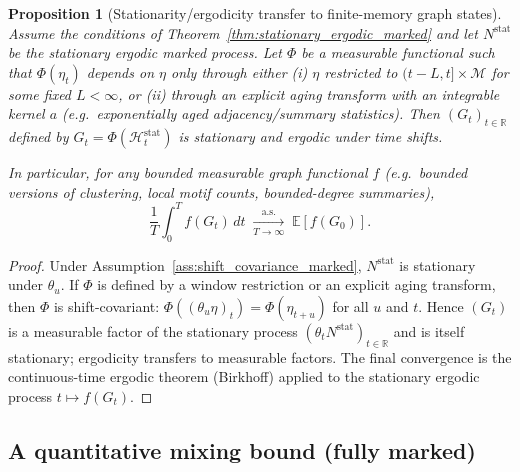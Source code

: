 \documentclass[12pt]{article}
\newtheorem{proposition}[theorem]{Proposition}
\begin{document}
\begin{proposition}[Stationarity/ergodicity transfer to finite-memory graph states]
\label{prop:graph_state_ergodic}
Assume the conditions of Theorem~\ref{thm:stationary_ergodic_marked} and let $N^{\mathrm{stat}}$ be the stationary ergodic marked process.
Let $\Phi$ be a measurable functional such that $\Phi(\eta_t)$ depends on $\eta$ only through either (i) $\eta$ restricted to $(t-L,t]\times\mathcal M$ for some fixed $L<\infty$,
or (ii) through an explicit aging transform with an integrable kernel $a$ (e.g.\ exponentially aged adjacency/summary statistics).
Then $(G_t)_{t\in\mathbb R}$ defined by $G_t=\Phi(\mathcal H_t^{\mathrm{stat}})$ is stationary and ergodic under time shifts.

In particular, for any bounded measurable graph functional $f$ (e.g.\ bounded versions of clustering, local motif counts, bounded-degree summaries),
\[
\frac{1}{T}\int_0^T f(G_t)\,dt \;\xrightarrow[T\to\infty]{\text{a.s.}}\; \mathbb E[f(G_0)].
\]
\end{proposition}

\begin{proof}
Under Assumption~\ref{ass:shift_covariance_marked}, $N^{\mathrm{stat}}$ is stationary under $\theta_u$.
If $\Phi$ is defined by a window restriction or an explicit aging transform, then $\Phi$ is shift-covariant:
$\Phi((\theta_u\eta)_t)=\Phi(\eta_{t+u})$ for all $u$ and $t$.
Hence $(G_t)$ is a measurable factor of the stationary process $(\theta_t N^{\mathrm{stat}})_{t\in\mathbb R}$ and is itself stationary; ergodicity transfers to measurable factors.
The final convergence is the continuous-time ergodic theorem (Birkhoff) applied to the stationary ergodic process $t\mapsto f(G_t)$.
\end{proof}

\subsection{A quantitative mixing bound (fully marked)}
\end{document}
